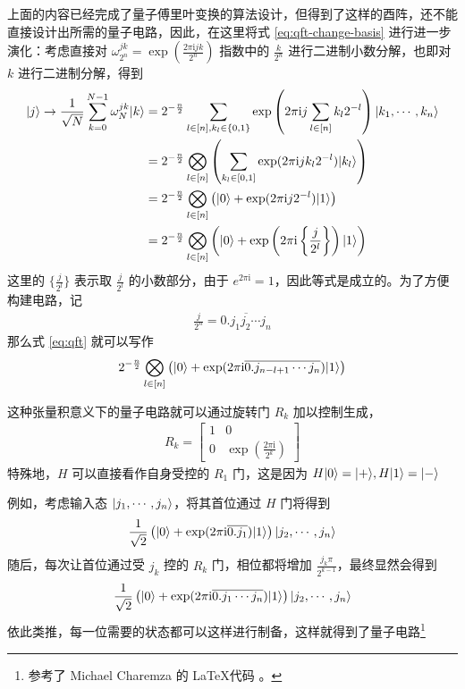 上面的内容已经完成了量子傅里叶变换的算法设计，但得到了这样的酉阵，还不能直接设计出所需的量子电路，因此，在这里将式 \ref{eq:qft-change-basis} 进行进一步演化：考虑直接对 $\omega_{2^n}^{jk}=\exp(\frac{2\pi\mathrm{i} jk}{2^n})$ 指数中的 $\frac{k}{2^n}$ 进行二进制小数分解，也即对 $k$ 进行二进制分解，得到 \begin{align}\begin{aligned}
        |j\rangle\to\frac{1}{\sqrt{N}}\sum_{k=0}^{N-1}\omega_N^{jk}|k\rangle
         & =2^{-\frac{n}{2}}\sum_{l\in[n],k_l\in\{0,1\}}\exp\left(2\pi\mathrm{i} j\sum_{l\in[n]}k_l2^{-l}\right)|k_1,\cdots,k_n\rangle                  \\
         & =2^{-\frac{n}{2}}\bigotimes_{l\in[n]}\left(\sum_{k_l\in[0,1]}\exp(2\pi\mathrm{i} jk_l2^{-l})|k_l\rangle\right)                               \\
         & =2^{-\frac{n}{2}}\bigotimes_{l\in[n]}\left(|0\rangle+\exp(2\pi\mathrm{i} j2^{-l})|1\rangle\right)                                              \\
         & =2^{-\frac{n}{2}}\bigotimes_{l\in[n]}\left(|0\rangle+\exp\left(2\pi\mathrm{i}\left\{\frac{j}{2^l}\right\}\right)|1\rangle\right)\label{eq:qft}
    \end{aligned}\end{align}
这里的 $\{\frac{j}{2^l}\}$ 表示取 $\frac{j}{2^l}$ 的小数部分，由于 $e^{2\pi\mathrm{i}}=1$，因此等式是成立的。为了方便构建电路，记 \begin{align}
    \frac{j}{2^n}=\overline{0.j_1 j_2\cdots j_n}
\end{align}
那么式 \ref{eq:qft} 就可以写作 \begin{align*}
    2^{-\frac{n}{2}}\bigotimes_{l\in[n]}\left(|0\rangle+\exp(2\pi\mathrm{i}\overline{0.j_{n-l+1}\cdots j_{n}})|1\rangle\right)
\end{align*}

这种张量积意义下的量子电路就可以通过旋转门 $R_k$ 加以控制生成，\begin{align}
    R_k=\begin{bmatrix}
            1 & 0                                           \\
            0 & \exp\left(\frac{2\pi\mathrm{i}}{2^k}\right)
        \end{bmatrix}
\end{align}
特殊地，$H$ 可以直接看作自身受控的 $R_1$ 门，这是因为 $H|0\rangle=|+\rangle,H|1\rangle=|-\rangle$

例如，考虑输入态 $|j_1,\cdots,j_n\rangle$，将其首位通过 $H$ 门将得到 \begin{align}
    \frac{1}{\sqrt{2}}\left(|0\rangle+\exp(2\pi\mathrm{i}\overline{0.j_1})|1\rangle\right)|j_2,\cdots,j_n\rangle
\end{align}
随后，每次让首位通过受 $j_k$ 控的 $R_k$ 门，相位都将增加 $\frac{j_k\pi}{2^{k-1}}$，最终显然会得到 \begin{align}
    \frac{1}{\sqrt{2}}\left(|0\rangle+\exp(2\pi\mathrm{i}\overline{0.j_1\cdots j_n})|1\rangle\right)|j_2,\cdots,j_n\rangle
\end{align}
依此类推，每一位需要的状态都可以这样进行制备，这样就得到了量子电路\footnote{参考了 Michael Charemza 的 \LaTeX 代码 \cite{charemza2006examples}。}

